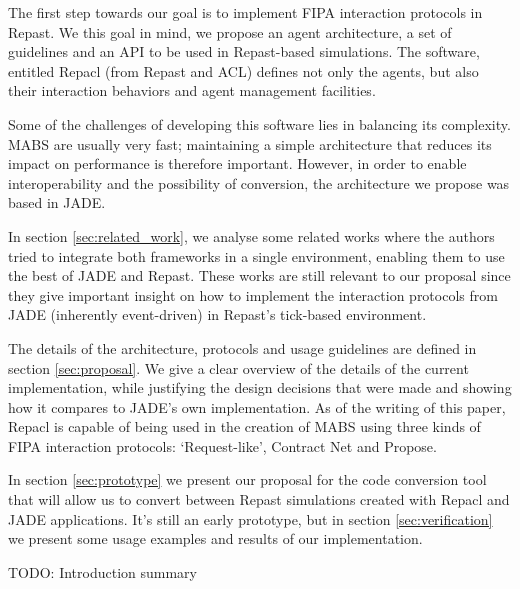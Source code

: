 The first step towards our goal is to implement FIPA interaction protocols in Repast. We this goal in mind, we propose an agent architecture, a set of guidelines and an API to be used in Repast-based simulations. The software, entitled Repacl (from Repast and ACL) defines not only the agents, but also their interaction behaviors and agent management facilities.

Some of the challenges of developing this software lies in balancing its complexity. MABS are usually very fast; maintaining a simple architecture that reduces its impact on performance is therefore important. However, in order to enable interoperability and the possibility of conversion, the architecture we propose was based in JADE.

In section \ref{sec:related_work}, we analyse some related works where the authors tried to integrate both frameworks in a single environment, enabling them to use the best of JADE and Repast. These works are still relevant to our proposal since they give important insight on how to implement the interaction protocols from JADE (inherently event-driven) in Repast's tick-based environment.

The details of the architecture, protocols and usage guidelines are defined in section \ref{sec:proposal}. We give a clear overview of the details of the current implementation, while justifying the design decisions that were made and showing how it compares to JADE's own implementation. As of the writing of this paper, Repacl is capable of being used in the creation of MABS using three kinds of FIPA interaction protocols: `Request-like', Contract Net and Propose.

In section \ref{sec:prototype} we present our proposal for the code conversion tool that will allow us to convert between Repast simulations created with Repacl and JADE applications. It's still an early prototype, but in section \ref{sec:verification} we present some usage examples and results of our implementation.

 TODO: Introduction summary